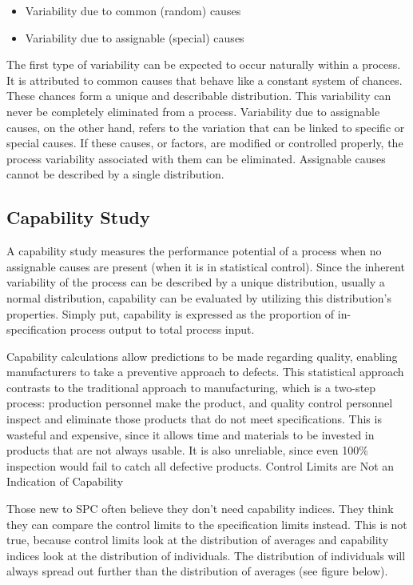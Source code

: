 \documentclass[]{report}
\begin{document}
\begin{itemize}
	\item Variability due to common (random) causes
	\item Variability due to assignable (special) causes
\end{itemize}
The first type of variability can be expected to occur naturally within a process. It is attributed to common causes that behave like a constant system of chances. These chances form a unique and describable distribution. This variability can never be completely eliminated from a process. Variability due to assignable causes, on the other hand, refers to the variation that can be linked to specific or special causes. If these causes, or factors, are modified or controlled properly, the process variability associated with them can be eliminated. Assignable causes cannot be described by a single distribution.
\subsection{Capability Study} 
A capability study measures the performance potential of a process when no assignable causes are present (when it is in statistical control). Since the inherent variability of the process can be described by a unique distribution, usually a normal distribution, capability can be evaluated by utilizing this distribution’s properties. Simply put, capability is expressed as the proportion of in-specification process output to total process input.

Capability calculations allow predictions to be made regarding quality, enabling manufacturers to take a preventive approach to defects. This statistical approach contrasts to the traditional approach to manufacturing, which is a two-step process: production personnel make the product, and quality control personnel inspect and eliminate those products that do not meet specifications. This is wasteful and expensive, since it allows time and materials to be invested in products that are not always usable. It is also unreliable, since even 100\% inspection would fail to catch all defective products.
Control Limits are Not an Indication of Capability

Those new to SPC often believe they don’t need capability indices. They think they can compare the control limits to the specification limits instead. This is not true, because control limits look at the distribution of averages and capability indices look at the distribution of individuals. The distribution of individuals will always spread out further than the distribution of averages (see figure below). 
\end{document}
